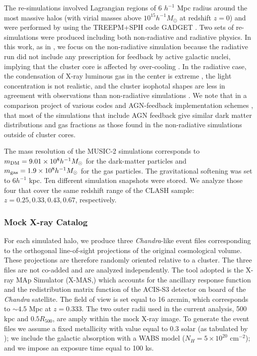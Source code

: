 \documentclass[iop,twocolumn]{emulateapj}
\begin{document}
{The re-simulations involved Lagrangian regions of 6 $h^{-1}$ Mpc
radius around the most massive halos (with virial masses above
$10^{15} h^{-1} M_{\odot}$ at redshift $z=0$) and were performed by using the TREEPM+SPH code GADGET
\citep{springel2005}. Two sets of re-simulations were produced including both
non-radiative and radiative physics. In this work, as in
\citet{meneghetti.etal.2014}, we focus on the non-radiative simulation
because the radiative run did not include any prescription for feedback by
active galactic nuclei, implying that the cluster core is affected by over-cooling \citep{borgani&kravtsov}.
 In the radiative case, the condensation of X-ray luminous gas in the center is extreme
\citep{rasia.etal.2013conc}, the light concentration is not realistic, and the cluster isophotal shapes are
less in agreement with observations than non-radiative simulations \citep{lau.etal.2012}. 
 We note that in a comparison project of various codes and AGN-feedback implementation schemes \citep{2015arXiv151103731S},  
that most of the simulations that include AGN feedback  give  similar dark matter distributions and gas fractions as those found  
in the non-radiative simulations outside of cluster cores.  

The mass resolution of the MUSIC-2 simulations corresponds to $m_{\rm
  DM}=9.01 \times 10^8 h^{-1}M_{\odot}$ for the dark-matter particles
and $m_{\rm gas}=1.9 \times 10^8 h^{-1} M_{\odot}$ for the gas
particles. The gravitational softening was set to $6 h^{-1}$ kpc.  Ten different simulation
snapshots were stored. We analyze those four that cover the same redshift range of the CLASH sample:
$z=0.25, 0.33, 0.43, 0.67$, respectively.


\subsubsection{Mock X-ray Catalog}
For each simulated halo, we produce three {\it Chandra}-like event files
corresponding to the orthogonal line-of-sight projections of the original cosmological volume. 
These projections are therefore randomly oriented relative to a cluster. 
The three files are not co-added and are analyzed independently.  
The tool adopted is the
X-ray MAp Simulator (X-MAS,\citealt{gardini.etal.2004,rasia.etal.2008}) 
which accounts for the ancillary response function and the redistribution matrix function 
of the ACIS-S3 detector on board of the {\it Chandra} satellite. 
The field of view is set equal to 16 arcmin, which corresponds to $\sim 4.5$
 Mpc at $z=0.333$. The two outer radii used in the current analysis, 500 kpc and $0.5 R_{500}$,
are amply within the mock X-ray image. To generate the
event files we assume a fixed metallicity with value equal to 0.3
solar (as tabulated by \citealt{1989GeCoA..53..197A}); we include the
galactic absorption with a WABS model ($N_H=5\times 10^{20}$
cm$^{-2}$); and we impose an exposure time equal to 100 ks.

}
\end{document}
